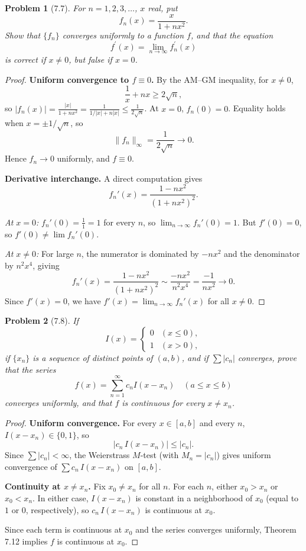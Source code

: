 \documentclass[12 pt]{article}
\newtheorem{prob}{Problem}
\begin{document}
\begin{prob}[7.7]
For $n=1,2,3, \ldots$, $x$ real, put
$$
f_{n}(x)=\frac{x}{1+n x^{2}}.
$$
Show that $\{f_{n}\}$ converges uniformly to a function $f$, and that the equation
$$
f^{\prime}(x)=\lim _{n \rightarrow \infty} f_{n}^{\prime}(x)
$$
is correct if $x \neq 0$, but false if $x=0$.
\end{prob}
\begin{proof}
\textbf{Uniform convergence to $f \equiv 0$.} By the AM--GM inequality, for $x \neq 0$,
$$
\frac{1}{x} + nx \geq 2\sqrt{n},
$$
so $|f_n(x)| = \frac{|x|}{1 + nx^2} = \frac{1}{1/|x| + n|x|} \leq \frac{1}{2\sqrt{n}}$. At $x = 0$, $f_n(0) = 0$. Equality holds when $x = \pm 1/\sqrt{n}$, so
$$
\|f_n\|_\infty = \frac{1}{2\sqrt{n}} \to 0.
$$
Hence $f_n \to 0$ uniformly, and $f \equiv 0$.

\textbf{Derivative interchange.} A direct computation gives
$$
f_n'(x) = \frac{1 - nx^2}{(1 + nx^2)^2}.
$$

\emph{At $x = 0$:} $f_n'(0) = \frac{1}{1} = 1$ for every $n$, so $\lim_{n \to \infty} f_n'(0) = 1$. But $f'(0) = 0$, so $f'(0) \neq \lim f_n'(0)$.

\emph{At $x \neq 0$:} For large $n$, the numerator is dominated by $-nx^2$ and the denominator by $n^2 x^4$, giving
$$
f_n'(x) = \frac{1 - nx^2}{(1 + nx^2)^2} \sim \frac{-nx^2}{n^2 x^4} = \frac{-1}{nx^2} \to 0.
$$
Since $f'(x) = 0$, we have $f'(x) = \lim_{n \to \infty} f_n'(x)$ for all $x \neq 0$.
\end{proof}

\begin{prob}[7.8]
If
$$
I(x)= \begin{cases}0 & (x \leq 0), \\ 1 & (x>0),\end{cases}
$$
if $\{x_{n}\}$ is a sequence of distinct points of $(a, b)$, and if $\sum|c_{n}|$ converges, prove that the series
$$
f(x)=\sum_{n=1}^{\infty} c_{n} I(x-x_{n}) \quad(a \leq x \leq b)
$$
converges uniformly, and that $f$ is continuous for every $x \neq x_{n}$.
\end{prob}
\begin{proof}
\textbf{Uniform convergence.} For every $x \in [a,b]$ and every $n$, $I(x - x_n) \in \{0, 1\}$, so
$$
|c_n\, I(x - x_n)| \leq |c_n|.
$$
Since $\sum |c_n| < \infty$, the Weierstrass $M$-test (with $M_n = |c_n|$) gives uniform convergence of $\sum c_n\, I(x - x_n)$ on $[a,b]$.

\textbf{Continuity at $x \neq x_n$.} Fix $x_0 \neq x_n$ for all $n$. For each $n$, either $x_0 > x_n$ or $x_0 < x_n$. In either case, $I(x - x_n)$ is constant in a neighborhood of $x_0$ (equal to $1$ or $0$, respectively), so $c_n\, I(x - x_n)$ is continuous at $x_0$.

Since each term is continuous at $x_0$ and the series converges uniformly, Theorem 7.12 implies $f$ is continuous at $x_0$.
\end{proof}
\end{document}
